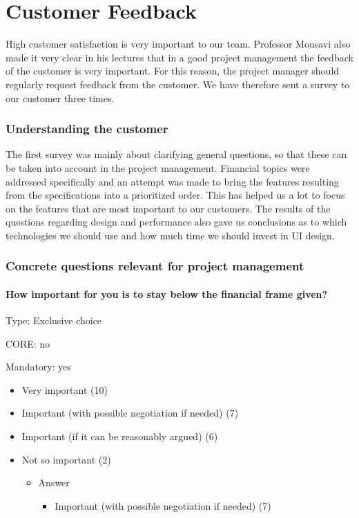 \chapter{Customer Feedback}
\label{sec:org4718a3c}

High customer satisfaction is very important to our team. Professor Mousavi also
made it very clear in his lectures that in a good project management the
feedback of the customer is very important. For this reason, the project manager
should regularly request feedback from the customer. We have therefore sent a
survey to our customer three times.

\subsection{Understanding the customer}
\label{sec:org62e7666}
The first survey was mainly about clarifying general questions, so that these can be taken into account in the project
management. Financial topics were addressed specifically and an attempt was made
to bring the features resulting from the specifications into a prioritized
order. This has helped us a lot to focus on
the features that are most important to our customers. The results of the
questions regarding design and performance also gave us conclusions as to which
technologies we should use and how much time we should invest in UI design.
\subsection{Concrete questions relevant for project management}
\label{sec:orgd256524}
\subsubsection{How important for you is to stay below the financial frame given?}
\label{sec:orga929d3d}
Type: Exclusive choice 

CORE: no

Mandatory: yes 

\begin{itemize}
	\item Very important (10)
	\item Important (with possible negotiation if needed) (7)
	\item Important (if it can be reasonably argued) (6)
	\item Not so important (2)
	
	\begin{itemize}
		\item Answer
		\begin{itemize}
			\item Important (with possible negotiation if needed) (7)
		\end{itemize}
	\end{itemize}
\end{itemize}


